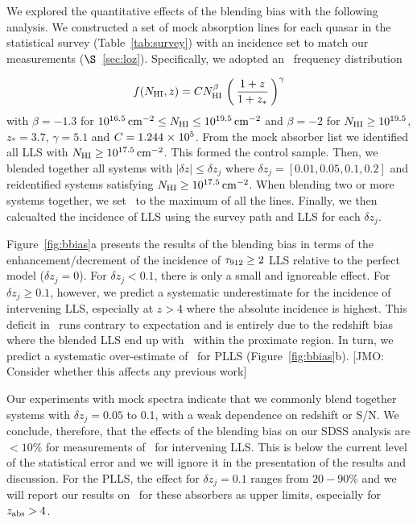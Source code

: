 \documentclass[12pt,preprint]{aastex}
\begin{document}
We explored the quantitative effects of the blending bias with
the following analysis.  We constructed a set of mock absorption
lines for each quasar in the statistical survey (Table~\ref{tab:survey})
with an incidence set to match our measurements ($\S$~\ref{sec:loz}).
Specifically, we adopted an \nhi\ frequency distribution

\begin{equation}
f(N_{\rm HI},z) = C N_{\rm HI}^\beta \, \left ( \, \frac{1+z}{1+z_*} \, \right )^\gamma
\label{eqn:fnmock}
\end{equation}
with $\beta = -1.3$ for $10^{16.5} \, {\rm cm^{-2}} \le N_{\rm HI} \le 10^{19.5} \, {\rm cm^{-2}}$
and $\beta = -2$ for $N_{\rm HI} \ge 10^{19.5}$, $z_* = 3.7$,
$\gamma = 5.1$ and $C=1.244 {\; \times \; 10^{5}}$.
From the mock absorber list we identified all LLS with $N_{\rm HI} \ge 10^{17.5} \, {\rm cm^{-2}}$.
This formed the control sample.
Then, we blended together all systems with $|\delta z| \le \delta z_j$
where $\delta z_j = [0.01, 0.05, 0.1, 0.2]$ and reidentified systems
satisfying $N_{\rm HI} \ge 10^{17.5} \, {\rm cm^{-2}}$.  When blending two or more 
systems together, we set \zabs\ to the maximum of all the lines.
Finally, we then calcualted the incidence of LLS using the survey
path and LLS for each $\delta z_j$.

Figure~\ref{fig:bbias}a presents the results of the blending bias in
terms of the enhancement/decrement of the incidence of $\tau_{\rm 912} \ge 2$ LLS
relative to the perfect model ($\delta z_j = 0$).
For $\delta z_j < 0.1$, there is only a small and ignoreable effect.
For $\delta z_j \ge 0.1$, however, we predict a systematic underestimate
for the incidence of intervening LLS, especially at $z>4$ where
the absolute incidence is highest.  
This deficit in \lzlls\ runs contrary to expectation and is entirely
due to the redshift bias where the blended LLS end up with \zlls\
within the proximate region.  
In turn, we predict a systematic over-estimate of \lzlls\ 
for PLLS (Figure~\ref{fig:bbias}b).
[JMO: Consider whether this affects any previous work]

Our experiments with mock spectra indicate that we commonly blend
together systems with $\delta z_j = 0.05$ to 0.1, with a weak dependence
on redshift or S/N.  
We conclude, therefore, that the effects of the blending bias
on our SDSS analysis are $< 10\%$ for measurements of \lzlls\
for intervening LLS.
This is below the current level of the statistical
error and we will ignore it in the presentation of the results and
discussion.  For the PLLS, the effect for $\delta z_j = 0.1$ 
ranges from $20-90\%$ and we will report our results on \lzlls\ 
for these absorbers as upper limits, especially for $z_{\rm abs} > 4$.
\end{document}
